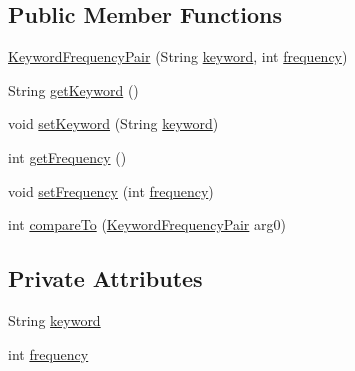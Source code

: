 \subsection*{Public Member Functions}
\begin{DoxyCompactItemize}
\item 
\hyperlink{classbr_1_1usp_1_1cata_1_1model_1_1_keyword_frequency_pair_a9d48547d1391965ca9169b4d5c7ceb6e}{Keyword\+Frequency\+Pair} (String \hyperlink{classbr_1_1usp_1_1cata_1_1model_1_1_keyword_frequency_pair_a4cf9aecf7465bbf0e90b2d46526871ea}{keyword}, int \hyperlink{classbr_1_1usp_1_1cata_1_1model_1_1_keyword_frequency_pair_a3c3be681f3c4c4c8acc88ee583055a76}{frequency})
\item 
String \hyperlink{classbr_1_1usp_1_1cata_1_1model_1_1_keyword_frequency_pair_ada15da6151a93317f0321f3c9cb2f727}{get\+Keyword} ()
\item 
void \hyperlink{classbr_1_1usp_1_1cata_1_1model_1_1_keyword_frequency_pair_ace84ca475425f37028b4dc4ea8510122}{set\+Keyword} (String \hyperlink{classbr_1_1usp_1_1cata_1_1model_1_1_keyword_frequency_pair_a4cf9aecf7465bbf0e90b2d46526871ea}{keyword})
\item 
int \hyperlink{classbr_1_1usp_1_1cata_1_1model_1_1_keyword_frequency_pair_a8f45c084e5ce09d652ac448ace447108}{get\+Frequency} ()
\item 
void \hyperlink{classbr_1_1usp_1_1cata_1_1model_1_1_keyword_frequency_pair_a6a128daabaf0bcd2d80f2be85b7c78c0}{set\+Frequency} (int \hyperlink{classbr_1_1usp_1_1cata_1_1model_1_1_keyword_frequency_pair_a3c3be681f3c4c4c8acc88ee583055a76}{frequency})
\item 
int \hyperlink{classbr_1_1usp_1_1cata_1_1model_1_1_keyword_frequency_pair_ad57b1af24d51dd9785b1a3c9f7ffb470}{compare\+To} (\hyperlink{classbr_1_1usp_1_1cata_1_1model_1_1_keyword_frequency_pair}{Keyword\+Frequency\+Pair} arg0)
\end{DoxyCompactItemize}
\subsection*{Private Attributes}
\begin{DoxyCompactItemize}
\item 
String \hyperlink{classbr_1_1usp_1_1cata_1_1model_1_1_keyword_frequency_pair_a4cf9aecf7465bbf0e90b2d46526871ea}{keyword}
\item 
int \hyperlink{classbr_1_1usp_1_1cata_1_1model_1_1_keyword_frequency_pair_a3c3be681f3c4c4c8acc88ee583055a76}{frequency}
\end{DoxyCompactItemize}


